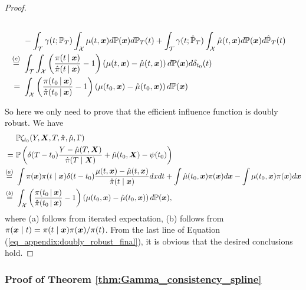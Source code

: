 \begin{proof}
\begin{equation}
\begin{split}
        \\&
        -\int_{\mathcal{T}}\gamma(t; \mathbb{P}_T)\int_{\mathcal{X}}\mu(t,\boldsymbol{x})d\mathbb{P}(\boldsymbol{x})d\mathbb{P}_T(t)
        +\int_{\mathcal{T}}\gamma(t; \hat {\mathbb{P}}_T)\int_{\mathcal{X}}\hat \mu(t,\boldsymbol{x})d\mathbb{P}(\boldsymbol{x})d\hat {\mathbb{P}}_T(t)
        \\\stackrel{(c)}{=}\,\,&
        \int_{\mathcal{T}}\int_{\mathcal{X}}\left(\frac{\pi(t\,|\: \boldsymbol{x})}{\hat\pi(t\,|\: \boldsymbol{x})}-1\right)\left(\mu(t,\boldsymbol{x})-\hat \mu(t,\boldsymbol{x})\right)d\mathbb{P}(\boldsymbol{x})d\delta_{t_0}(t)
        \\=\,\,&
        \int_{\mathcal{X}}\left(\frac{\pi(t_0\,|\: \boldsymbol{x})}{\hat\pi(t_0\,|\: \boldsymbol{x})}-1\right)\left(\mu(t_0,\boldsymbol{x})-\hat \mu(t_0,\boldsymbol{x})\right)d\mathbb{P}(\boldsymbol{x})
    \end{split}
\end{equation}
\fi

So here we only need to prove that the efficient influence function is doubly robust. We have
\begin{equation}\label{eq_appendix:doubly_robust_final}
    \begin{split}
        &\mathbb{P}\zeta_{t_0}(Y,\boldsymbol{X},T,\hat\pi,\hat \mu,\Gamma)
        \\=\,\, &
        \mathbb{P}\left(\delta(T-t_{0})\frac{Y-\hat\mu(T,\boldsymbol{X})}{\hat\pi(T\mid\boldsymbol{X})}+\hat\mu(t_{0},\boldsymbol{X})-\psi(t_{0})\right) 
        \\\stackrel{(a)}{=}\,\, &
        \int\pi(\boldsymbol{x})\pi(t\mid\boldsymbol{x})\delta(t-t_0)\frac{\mu(t,\boldsymbol{x})-\hat\mu(t,\boldsymbol{x})}{\hat\pi(t\mid\boldsymbol{x})}dxdt+\int\hat\mu(t_0,\boldsymbol{x})\pi(\boldsymbol{x})d\boldsymbol{x}-\int\mu(t_0,\boldsymbol{x})\pi(\boldsymbol{x})d\boldsymbol{x}
        \\\stackrel{(b)}{=}\,\,&
        \int_{\mathcal{X}}\left(\frac{\pi(t_0\,|\: \boldsymbol{x})}{\hat\pi(t_0\,|\: \boldsymbol{x})}-1\right)\left(\mu(t_0,\boldsymbol{x})-\hat \mu(t_0,\boldsymbol{x})\right)d\mathbb{P}(\boldsymbol{x}),
    \end{split}
\end{equation}
where (a) follows from iterated expectation, (b) follows from $\pi(\boldsymbol{x}\mid t)=\pi(t\mid\boldsymbol{x})\pi(\boldsymbol{x})/\pi(t)$.
From the last line of Equation (\ref{eq_appendix:doubly_robust_final}), it is obvious that the desired conclusions hold.
\end{proof}



\subsubsection{Proof of Theorem \ref{thm:Gamma_consistency_spline}}

